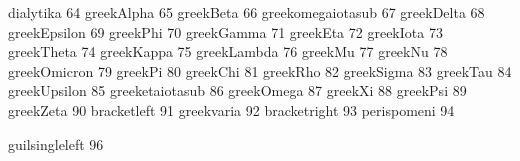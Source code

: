 dialytika                          64
 greekAlpha                         65
 greekBeta                          66
 greekomegaiotasub                  67
 greekDelta                         68
 greekEpsilon                       69
 greekPhi                           70
 greekGamma                         71
 greekEta                           72
 greekIota                          73
 greekTheta                         74
 greekKappa                         75
 greekLambda                        76
 greekMu                            77
 greekNu                            78
 greekOmicron                       79
 greekPi                            80
 greekChi                           81
 greekRho                           82
 greekSigma                         83
 greekTau                           84
 greekUpsilon                       85
 greeketaiotasub                    86
 greekOmega                         87
 greekXi                            88
 greekPsi                           89
 greekZeta                          90
 bracketleft                        91
 greekvaria                         92
 bracketright                       93
 perispomeni                        94

 guilsingleleft                     96

